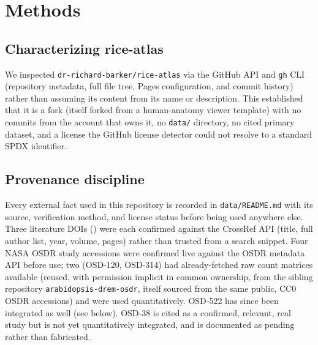 \section{Methods}

\subsection{Characterizing rice-atlas}
We inspected \texttt{dr-richard-barker/rice-atlas} via the GitHub API and \texttt{gh} CLI
(repository metadata, full file tree, Pages configuration, and commit history) rather than
assuming its content from its name or description. This established that it is a fork
(itself forked from a human-anatomy viewer template) with no commits from the account that
owns it, no \texttt{data/} directory, no cited primary dataset, and a license the GitHub
license detector could not resolve to a standard SPDX identifier.

\subsection{Provenance discipline}
Every external fact used in this repository is recorded in \texttt{data/README.md} with
its source, verification method, and license status before being used anywhere else. Three
literature DOIs (\citealp{Klepikova2016,Shahan2022,Vijayan2021}) were each confirmed
against the CrossRef API (title, full author list, year, volume, pages) rather than
trusted from a search snippet. Four NASA OSDR study accessions were confirmed live against
the OSDR metadata API before use; two (OSD-120, OSD-314) had already-fetched raw count
matrices available (reused, with permission implicit in common ownership, from the sibling
repository \texttt{arabidopsis-drem-osdr}, itself sourced from the same public, CC0 OSDR
accessions) and were used quantitatively. OSD-522 \citep{OSD522,Olanrewaju2023} has since
been integrated as well (see below). OSD-38 \citep{OSD38} is cited as a confirmed, relevant, real study but
is not yet quantitatively integrated, and is documented as pending rather than fabricated.

